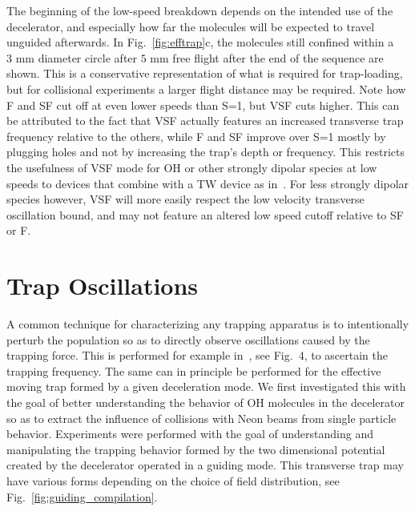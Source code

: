 The beginning of the low-speed breakdown depends on the intended use of the decelerator, and especially how far the molecules will be expected to travel unguided afterwards. 
In Fig.~\ref{fig:efftrap}c, the molecules still confined within a $3\text{ mm}$ diameter circle after $5\text{ mm}$ free flight after the end of the sequence are shown. 
This is a conservative representation of what is required for trap-loading, but for collisional experiments a larger flight distance may be required.
Note how F and SF cut off at even lower speeds than S=1, but VSF cuts higher. 
This can be attributed to the fact that VSF actually features an increased transverse trap frequency relative to the others, while F and SF improve over S=1 mostly by plugging holes and not by increasing the trap's depth or frequency.
This restricts the usefulness of VSF mode for OH or other strongly dipolar species at low speeds to devices that combine with a TW device as in~\cite{Quintero-Perez2013}.
For less strongly dipolar species however, VSF will more easily respect the low velocity transverse oscillation bound, and may not feature an altered low speed cutoff relative to SF or F.



\section{Trap Oscillations}

A common technique for characterizing any trapping apparatus is to intentionally perturb the population so as to directly observe oscillations caused by the trapping force. 
This is performed for example in~\cite{stuhl2012uwave}, see Fig.~4, to ascertain the trapping frequency.
The same can in principle be performed for the effective moving trap formed by a given deceleration mode.
We first investigated this with the goal of better understanding the behavior of OH molecules in the decelerator so as to extract the influence of collisions with Neon beams from single particle behavior.
Experiments were performed with the goal of understanding and manipulating the trapping behavior formed by the two dimensional potential created by the decelerator operated in a guiding mode.
This transverse trap may have various forms depending on the choice of field distribution, see Fig.~\ref{fig:guiding_compilation}.

